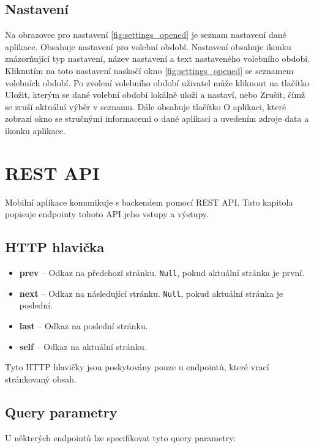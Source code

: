 \subsection*{Nastavení}
\label{ssec:design-settings}
	
Na obrazovce pro nastavení \ref{fig:settings_opened} je seznam nastavení dané aplikace. Obsahuje nastavení pro volební období. Nastavení obsahuje ikonku znázorňující typ nastavení, název nastavení a text nastaveného volebního obdobi. Kliknutím na toto nastavení naskočí okno \ref{fig:settings_opened} se seznamem volebních období. Po zvolení volebního období uživatel může kliknout na tlačítko Uložit, kterým se dané volební období lokálně uloží a nastaví, nebo Zrušit, čímž se zruší aktuální výběr \linebreak v seznamu. Dále obsahuje tlačítko O aplikaci, které zobrazí okno se stručnými informacemi \linebreak o dané aplikaci a uvedením zdroje data a ikonku aplikace.

\section{REST API}
\label{sec:rest}

Mobilní aplikace komunikuje s backendem pomocí REST API. Tato kapitola popisuje endpointy tohoto  API jeho vstupy a výstupy.

\subsection*{HTTP hlavička}

\begin{itemize}
	\item \textbf{prev} -- Odkaz na předchozí stránku. \lstinline|Null|, pokud aktuální stránka je první.
	\item \textbf{next} -- Odkaz na následující stránku. \lstinline|Null|, pokud aktuální stránka je poslední.
	\item \textbf{last} -- Odkaz na poslední stránku.
	\item \textbf{self} -- Odkaz na aktuální stránku.
\end{itemize}

\noindent Tyto HTTP hlavičky jsou poskytovány pouze u endpointů, které vrací stránkovaný obsah.

\subsection*{Query parametry}
U některých endpointů lze specifikovat tyto query parametry:

